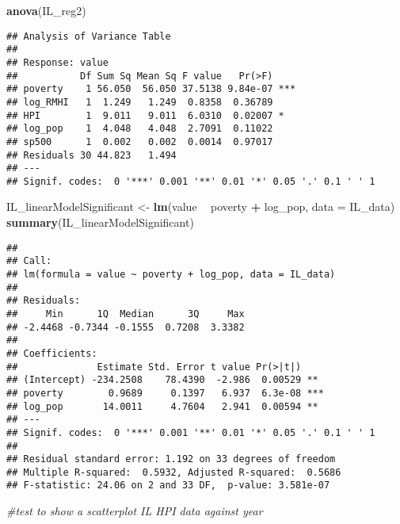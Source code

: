 \documentclass[
]{article}
\newenvironment{Shaded}{\begin{snugshade}}{\end{snugshade}}
\newcommand{\CommentTok}[1]{\textcolor[rgb]{0.56,0.35,0.01}{\textit{#1}}}
\newcommand{\DataTypeTok}[1]{\textcolor[rgb]{0.13,0.29,0.53}{#1}}
\newcommand{\KeywordTok}[1]{\textcolor[rgb]{0.13,0.29,0.53}{\textbf{#1}}}
\newcommand{\NormalTok}[1]{#1}
\newcommand{\OperatorTok}[1]{\textcolor[rgb]{0.81,0.36,0.00}{\textbf{#1}}}
\newcommand{\StringTok}[1]{\textcolor[rgb]{0.31,0.60,0.02}{#1}}
\begin{document}
\begin{Shaded}
\begin{Highlighting}[]
\KeywordTok{anova}\NormalTok{(IL_reg2)}
\end{Highlighting}
\end{Shaded}

\begin{verbatim}
## Analysis of Variance Table
## 
## Response: value
##           Df Sum Sq Mean Sq F value   Pr(>F)    
## poverty    1 56.050  56.050 37.5138 9.84e-07 ***
## log_RMHI   1  1.249   1.249  0.8358  0.36789    
## HPI        1  9.011   9.011  6.0310  0.02007 *  
## log_pop    1  4.048   4.048  2.7091  0.11022    
## sp500      1  0.002   0.002  0.0014  0.97017    
## Residuals 30 44.823   1.494                     
## ---
## Signif. codes:  0 '***' 0.001 '**' 0.01 '*' 0.05 '.' 0.1 ' ' 1
\end{verbatim}

\begin{Shaded}
\begin{Highlighting}[]
\NormalTok{IL_linearModelSignificant <-}\StringTok{ }\KeywordTok{lm}\NormalTok{(value }\OperatorTok{~}\StringTok{ }\NormalTok{poverty }\OperatorTok{+}\StringTok{ }\NormalTok{log_pop, }\DataTypeTok{data =}\NormalTok{ IL_data)}
\KeywordTok{summary}\NormalTok{(IL_linearModelSignificant)}
\end{Highlighting}
\end{Shaded}

\begin{verbatim}
## 
## Call:
## lm(formula = value ~ poverty + log_pop, data = IL_data)
## 
## Residuals:
##     Min      1Q  Median      3Q     Max 
## -2.4468 -0.7344 -0.1555  0.7208  3.3382 
## 
## Coefficients:
##              Estimate Std. Error t value Pr(>|t|)    
## (Intercept) -234.2508    78.4390  -2.986  0.00529 ** 
## poverty        0.9689     0.1397   6.937  6.3e-08 ***
## log_pop       14.0011     4.7604   2.941  0.00594 ** 
## ---
## Signif. codes:  0 '***' 0.001 '**' 0.01 '*' 0.05 '.' 0.1 ' ' 1
## 
## Residual standard error: 1.192 on 33 degrees of freedom
## Multiple R-squared:  0.5932, Adjusted R-squared:  0.5686 
## F-statistic: 24.06 on 2 and 33 DF,  p-value: 3.581e-07
\end{verbatim}

\begin{Shaded}
\begin{Highlighting}[]
\CommentTok{#test to show a scatterplot IL HPI data against year}
\end{Highlighting}
\end{Shaded}
\end{document}
